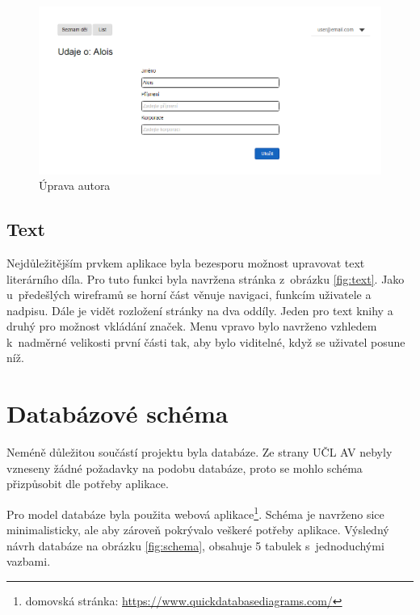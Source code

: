             \begin {figure}[H]\centering
                \includegraphics[width=\textwidth]{images/edit}
                \caption {Úprava autora}
                \label {fig:edit}
            \end{figure}
            
        \subsection{Text}
            Nejdůležitějším prvkem aplikace byla bezesporu možnost upravovat text literárního díla. Pro tuto funkci byla navržena stránka z~obrázku \ref{fig:text}. Jako u~předešlých wireframů se horní část věnuje navigaci, funkcím uživatele a nadpisu. Dále je vidět rozložení stránky na dva oddíly. Jeden pro text knihy a druhý pro možnost vkládání značek. Menu vpravo bylo navrženo vzhledem k~nadměrné velikosti první části tak, aby bylo viditelné, když se uživatel posune níž.
            
    \section{Databázové schéma}
        Neméně důležitou součástí projektu byla databáze. Ze strany UČL AV nebyly vzneseny žádné požadavky na podobu databáze, proto se mohlo schéma přizpůsobit dle potřeby aplikace.
        
        Pro model databáze byla použita webová aplikace\footnote{domovská stránka: \url{https://www.quickdatabasediagrams.com/}}. Schéma je navrženo sice minimalisticky, ale aby zároveň pokrývalo veškeré potřeby aplikace. Výsledný návrh databáze na obrázku \ref{fig:schema}, obsahuje 5 tabulek s~jednoduchými vazbami.
        
